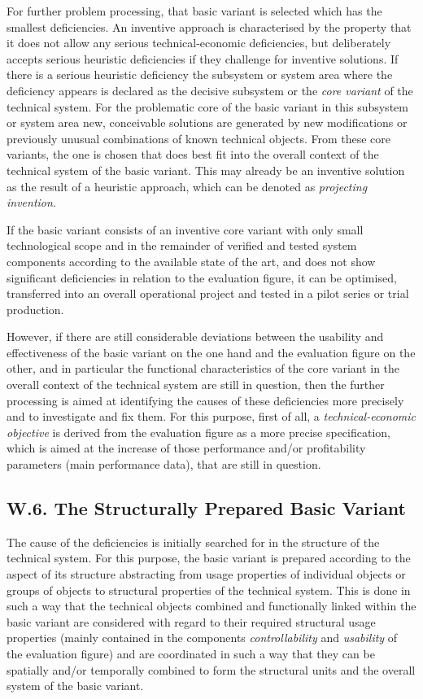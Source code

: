 \documentclass[11pt,a4paper]{article}
\begin{document}
For further problem processing, that basic variant is selected which has the
smallest deficiencies. An inventive approach is characterised by the property
that it does not allow any serious technical-economic deficiencies, but
deliberately accepts serious heuristic deficiencies if they challenge for
inventive solutions.  If there is a serious heuristic deficiency the subsystem
or system area where the deficiency appears is declared as the decisive
subsystem or the \emph{core variant} of the technical system. For the
problematic core of the basic variant in this subsystem or system area new,
conceivable solutions are generated by new modifications or previously unusual
combinations of known technical objects.  From these core variants, the one is
chosen that does best fit into the overall context of the technical system of
the basic variant. This may already be an inventive solution as the result of
a heuristic approach, which can be denoted as \emph{projecting invention}.

If the basic variant consists of an inventive core variant with only small
technological scope and in the remainder of verified and tested system
components according to the available state of the art, and does not show
significant deficiencies in relation to the evaluation figure, it can be
optimised, transferred into an overall operational project and tested in a
pilot series or trial production.

However, if there are still considerable deviations between the usability and
effectiveness of the basic variant on the one hand and the evaluation figure
on the other, and in particular the functional characteristics of the core
variant in the overall context of the technical system are still in question,
then the further processing is aimed at identifying the causes of these
deficiencies more precisely and to investigate and fix them. For this purpose,
first of all, a \emph{technical-economic objective} is derived from the
evaluation figure as a more precise specification, which is aimed at the
increase of those performance and/or profitability parameters (main
performance data), that are still in question.

\subsection*{W.6. The Structurally Prepared Basic Variant}

The cause of the deficiencies is initially searched for in the structure of
the technical system. For this purpose, the basic variant is prepared
according to the aspect of its structure abstracting from usage properties of
individual objects or groups of objects to structural properties of the
technical system. This is done in such a way that the technical objects
combined and functionally linked within the basic variant are considered with
regard to their required structural usage properties (mainly contained in the
components \emph{controllability} and \emph{usability} of the evaluation
figure) and are coordinated in such a way that they can be spatially and/or
temporally combined to form the structural units and the overall system of the
basic variant.
\end{document}
